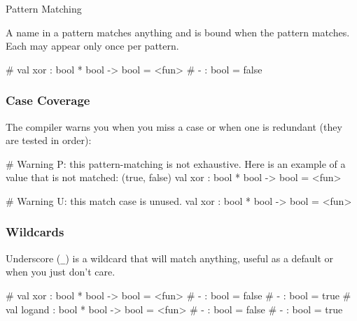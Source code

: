 \documentclass{plt}
\begin{document}
\begin{frame}[fragile]{Pattern Matching}

A name in a pattern matches anything and is bound when the pattern
matches.  Each may appear only once per pattern.

\begin{interactive}
# 
val xor : bool * bool -> bool = <fun>
# 
- : bool = false
\end{interactive}

\end{frame}

\begin{frame}[fragile]
  \frametitle{Case Coverage}

The compiler warns you when you miss a case or when one is redundant
(they are tested in order):

\begin{interactive}
# 
Warning P: this pattern-matching is not exhaustive.
Here is an example of a value that is not matched:
(true, false)
val xor : bool * bool -> bool = <fun>

# 
Warning U: this match case is unused.
val xor : bool * bool -> bool = <fun>
\end{interactive}

\end{frame}

\begin{frame}[fragile]
  \frametitle{Wildcards}

Underscore (\verb|_|) is a wildcard that will match anything, useful
as a default or when you just don't care.

\begin{interactive}
# 
val xor : bool * bool -> bool = <fun>
# 
- : bool = false
# 
- : bool = true
# 
val logand : bool * bool -> bool = <fun>
# 
- : bool = false
# 
- : bool = true
\end{interactive}

\end{frame}
\end{document}
